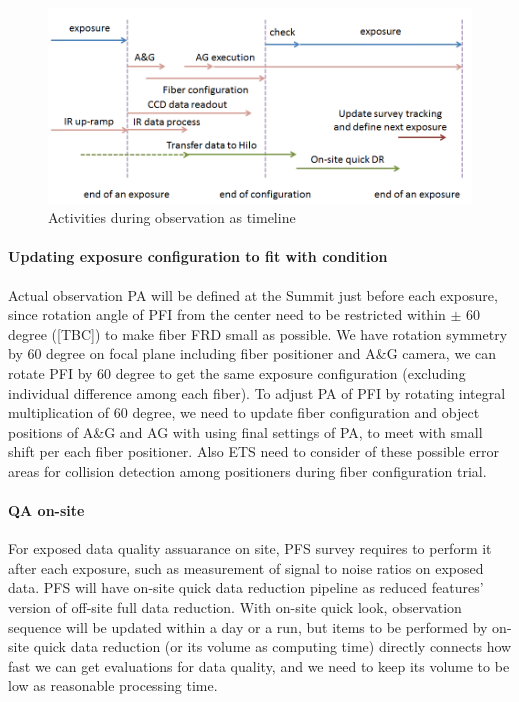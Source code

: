 \documentclass[a4paper,notitlepage]{article}
\begin{document}
\begin{figure}[htb]
  \begin{center}
    \includegraphics[width=.75\linewidth]{sciops-scireq-slide-oneexp.png}
  \end{center}
  \caption{Activities during observation as timeline}
  \label{fig:sciops-scireq-slide-oneexp}
\end{figure}

\paragraph{Updating exposure configuration to fit with condition}

Actual observation PA will be defined at the Summit just before each exposure, 
since rotation angle of PFI from the center need to be restricted within $\pm$ 
60 degree ([TBC]) to make fiber FRD small as possible. 
We have rotation symmetry by 60 degree on focal plane including fiber 
positioner and A\&G camera, we can rotate PFI by 60 degree to get the same 
exposure configuration (excluding individual difference among each fiber). 
To adjust PA of PFI by rotating integral multiplication of 60 degree, 
we need to update fiber configuration and object positions of A\&G and AG 
with using final settings of PA, to meet with small shift per each fiber 
positioner. 
Also ETS need to consider of these possible error areas for collision 
detection among positioners during fiber configuration trial. 


\paragraph{QA on-site}

For exposed data quality assuarance on site, 
PFS survey requires to perform it after each exposure, 
such as measurement of signal to noise ratios on exposed data. 
PFS will have on-site quick data reduction pipeline as reduced features' 
version of off-site full data reduction. 
With on-site quick look, observation sequence will be updated within a day 
or a run, but items to be performed by on-site quick data reduction 
(or its volume as computing time) directly 
connects how fast we can get evaluations for data quality, and we need to keep 
its volume to be low as reasonable processing time. 
\end{document}
